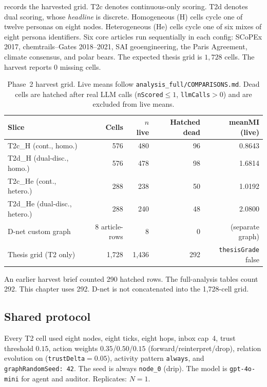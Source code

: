  records the harvested grid.
T2c denotes continuous-only scoring.
T2d denotes dual scoring, whose \emph{headline} is discrete.
Homogeneous (H) cells cycle one of twelve personas on eight nodes.
Heterogeneous (He) cells cycle one of six mixes of eight persona identifiers.
Six core articles run sequentially in each config: SCoPEx 2017, chemtrails--Gates 2018--2021, SAI geoengineering, the Paris Agreement, climate consensus, and polar bears.
The expected thesis grid is $1{,}728$ cells.
The harvest reports $0$ missing cells.

\begin{table}[t]
\centering
\caption[Phase~2 harvest grid]{Phase~2 harvest grid.
Live means follow \texttt{analysis\_full/COMPARISONS.md}.
Dead cells are hatched after real LLM calls (\texttt{nScored}$\le 1$, \texttt{llmCalls}$>0$) and are excluded from live means.}
\label{tab:grid}
\begin{threeparttable}
\small
\begin{tabular}{lrrrr}
\toprule
Slice & Cells & $n$ live & Hatched dead & meanMI (live) \\
\midrule
T2c\_H (cont., homo.) & 576 & 480 & 96 & 0.8643 \\
T2d\_H (dual-disc., homo.) & 576 & 478 & 98 & 1.6814 \\
T2c\_He (cont., hetero.) & 288 & 238 & 50 & 1.0192 \\
T2d\_He (dual-disc., hetero.) & 288 & 240 & 48 & 2.0800 \\
D-net custom graph & 8 article-rows & 8 & 0 & (separate graph) \\
\midrule
Thesis grid (T2 only) & 1,728 & 1,436 & 292 & \texttt{thesisGrade} false \\
\bottomrule
\end{tabular}
\begin{tablenotes}
\footnotesize
An earlier harvest brief counted 290 hatched rows.
The full-analysis tables count 292.
This chapter uses 292.
D-net is not concatenated into the 1,728-cell grid.
\end{tablenotes}
\end{threeparttable}
\end{table}

\subsection{Shared protocol}

Every T2 cell used eight nodes, eight ticks, eight hops, inbox cap~4, trust threshold $0.15$, action weights $0.35$/$0.50$/$0.15$ (forward/reinterpret/drop), relation evolution on (\texttt{trustDelta}$=0.05$), activity pattern \texttt{always}, and \texttt{graphRandomSeed: 42}.
The seed is always \texttt{node\_0} (drip).
The model is \texttt{gpt-4o-mini} for agent and auditor.
Replicates: $N=1$.

